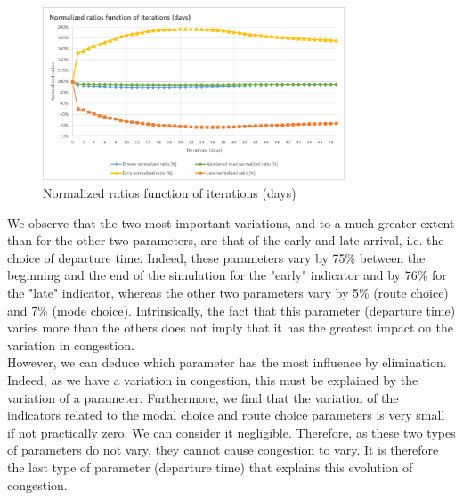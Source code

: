 \documentclass[a4paper, 12pt,oneside]{article}
\begin{document}
\begin{figure}[H]
    \centering
    \includegraphics[width=0.8\textwidth]{Images/Step2/Normalized_ratios_function_iterations_2.png}
    \caption{Normalized ratios function of iterations (days)}
    \label{fig:Normalized ratios function of iterations (days)}
\end{figure}

We observe that the two most important variations, and to a much greater extent than for the other two parameters, are that of the early and late arrival, i.e. the choice of departure time. Indeed, these parameters vary by 75\% between the beginning and the end of the simulation for the "early" indicator and by 76\% for the "late" indicator, whereas the other two parameters vary by 5\% (route choice) and 7\% (mode choice). Intrinsically, the fact that this parameter (departure time) varies more than the others does not imply that it has the greatest impact on the variation in congestion.\\


However, we can deduce which parameter has the most influence by elimination. Indeed, as we have a variation in congestion, this must be explained by the variation of a parameter. Furthermore, we find that the variation of the indicators related to the modal choice and route choice parameters is very small if not practically zero. We can consider it negligible. Therefore, as these two types of parameters do not vary, they cannot cause congestion to vary. It is therefore the last type of parameter (departure time) that explains this evolution of congestion.\\
\end{document}
